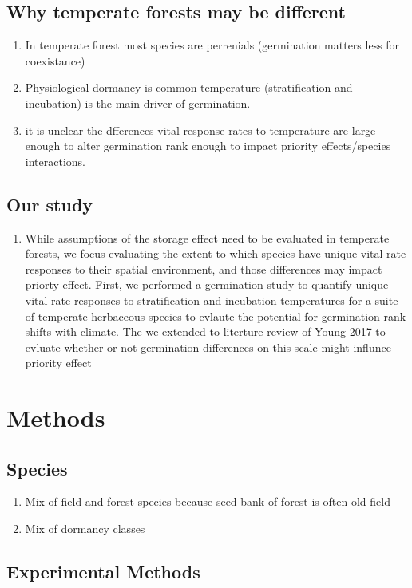 \documentclass{article}\usepackage[]{graphicx}\usepackage[]{color}
\begin{document}
\subsection{Why temperate forests may be different}
\begin{enumerate}
\item In temperate forest most species are perrenials (germination matters less for coexistance)
\item Physiological dormancy is common temperature (stratification and incubation) is the main driver of germination.
\item it is unclear the dfferences vital response rates to temperature are large enough to alter germination rank enough to impact priority effects/species interactions. 
\end{enumerate}
\subsection{Our study}
\begin{enumerate}
\item While assumptions of the storage effect need to be evaluated in temperate forests, we focus evaluating the extent to which species have unique vital rate responses to their spatial environment, and those differences may impact priorty effect. First, we performed a germination study to quantify unique vital rate responses to stratification and incubation temperatures for a suite of temperate herbaceous species to evlaute the potential for germination rank shifts with climate. The we extended to literture review of Young 2017 to evluate whether or not germination differences on this scale might influnce priority effect 
\end{enumerate}

\section*{Methods}
\subsection*{Species}
\begin{enumerate}
\item Mix of field and forest species because seed bank of forest is often old field
\item Mix of dormancy classes
\end{enumerate}
\subsection{Experimental Methods}
\end{document}
